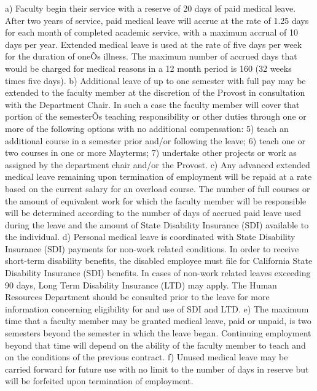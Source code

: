 \documentclass[letterpaper, 11pt]{article}
\begin{document}
a) Faculty begin their service with a reserve of 20 days of paid medical leave.  After two years of service, paid medical leave will accrue at the rate of 1.25 days for each month of completed academic service, with a maximum accrual of 10 days per year.  Extended medical leave is used at the rate of five days per week for the duration of oneÕs illness. The maximum number of accrued days that would be charged for medical reasons in a 12 month period is 160 (32 weeks times five days).
b) Additional leave of up to one semester with full pay may be extended to the faculty member at the discretion of the Provost in consultation with the Department Chair.  In such a case the faculty member will cover that portion of the semesterÕs teaching responsibility or other duties through one or more of the following options with no additional compensation:
5) teach an additional course in a semester prior and/or following the leave;
6) teach one or two courses in one or more Mayterms;
7) undertake other projects or work as assigned by the department chair and/or the Provost.
c) Any advanced extended medical leave remaining upon termination of employment will be repaid at a rate based on the current salary for an overload course.
   The number of full courses or the amount of equivalent work for which the faculty member will be responsible will be determined according to the number of days of accrued paid leave used during the leave and the amount of State Disability Insurance (SDI) available to the individual.
d) Personal medical leave is coordinated with State Disability Insurance (SDI) payments for non-work related conditions. In order to receive short-term disability benefits, the disabled employee must file for California State Disability Insurance (SDI) benefits.  In cases of non-work related leaves exceeding 90 days, Long Term Disability Insurance (LTD) may apply.  The Human Resources Department should be consulted prior to the leave for more information concerning eligibility for and use of SDI and LTD.  
e) The maximum time that a faculty member may be granted medical leave, paid or unpaid, is two semesters beyond the semester in which the leave began.  Continuing employment beyond that time will depend on the ability of the faculty member to teach and on the conditions of the previous contract.
f) Unused medical leave may be carried forward for future use with no limit to the number of days in reserve but will be forfeited upon termination of employment.
   
\end{document}
